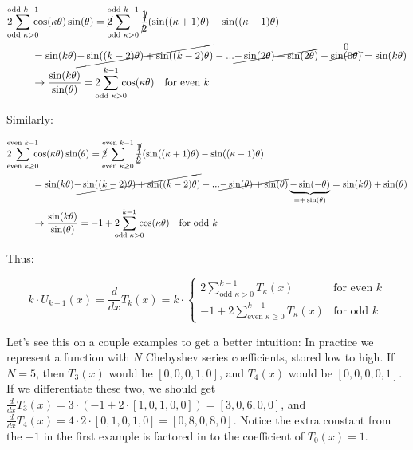 \documentclass[10pt]{article}
\begin{document}
\begin{align*}
2\!\!\!\!\sum_{\text{odd }\kappa>0}^{\text{odd }k-1} \!\!\!\!&\cos(\kappa\theta)\sin(\theta) = \cancel{2}\!\!\!\!\sum_{\text{odd } \kappa>0}^{\text{odd }k-1} \cancel{\frac{1}{2}}(\sin((\kappa+1)\theta) - \sin((\kappa-1)\theta)\\
&= \sin(k\theta) \cancel{-\sin((k-2)\theta) + \sin((k-2)\theta)} - ... \cancel{-\sin(2\theta) + \sin(2\theta)} - \overset{\text{\normalsize 0}}{\cancel{\sin(0\theta)}} = \sin(k\theta)\\
&\rightarrow \frac{\sin(k\theta)}{\sin(\theta)} = 2\!\!\!\!\sum_{\text{odd }\kappa>0}^{k-1} \!\!\!\!\cos(\kappa\theta) \quad \text{for even }k
\end{align*}

\noindent Similarly:

\begin{align*}
2\!\!\!\!\sum_{\text{even }\kappa \geq 0}^{\text{even }k-1} \!\!\!\!&\cos(\kappa\theta)\sin(\theta) = \cancel{2}\!\!\!\!\sum_{\text{even } \kappa \geq 0}^{\text{even }k-1} \cancel{\frac{1}{2}}(\sin((\kappa+1)\theta) - \sin((\kappa-1)\theta)\\
&= \sin(k\theta) \cancel{-\sin((k-2)\theta) + \sin((k-2)\theta)} - ... \cancel{-\sin(\theta) + \sin(\theta)} \underbrace{-\sin(-\theta)}_{=+\sin(\theta)} = \sin(k\theta) + \sin(\theta)\\
&\rightarrow \frac{\sin(k\theta)}{\sin(\theta)} = -1 + 2\!\!\!\!\sum_{\text{odd }\kappa>0}^{k-1} \!\!\!\!\cos(\kappa\theta) \quad \text{for odd }k
\end{align*}

\noindent Thus:

$$k \cdot U_{k-1}(x) = \frac{d}{dx} T_k(x) = k \cdot \begin{cases}
2\sum_{\text{odd } \kappa>0}^{k-1} T_\kappa(x) & \text{for even } k \\
-1 + 2\sum_{\text{even } \kappa \geq 0}^{k-1} T_\kappa(x) & \text{for odd } k
\end{cases}$$

Let's see this on a couple examples to get a better intuition: In practice we represent a function with $N$ Chebyshev series coefficients, stored low to high. If $N=5$, then $T_3(x)$ would be $[0, 0, 0, 1, 0]$, and $T_4(x)$ would be $[0, 0, 0, 0, 1]$. If we differentiate these two, we should get $\frac{d}{dx}T_3(x) = 3 \cdot(-1 + 2 \cdot [1, 0, 1, 0, 0]) = [3, 0, 6, 0, 0]$, and $\frac{d}{dx}T_4(x) = 4 \cdot 2 \cdot [0, 1, 0, 1, 0] = [0, 8, 0, 8, 0]$. Notice the extra constant from the $-1$ in the first example is factored in to the coefficient of $T_0(x) = 1$.
\end{document}
